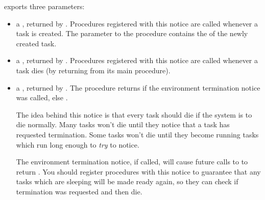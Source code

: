  exports three parameters:
\begin{itemize}
\item
 a , returned by .  Procedures
 registered with this notice are called whenever a task is created.
 The  parameter to the procedure contains the
  of the newly created task.
\item
 a , returned by .  Procedures
 registered with this notice are called whenever a task dies (by
 returning from its main procedure).
\item
 a , returned by
 .  The procedure  returns
  if the environment termination notice was called, else
 .
 
 The idea behind this notice is that every task should die if the system is 
 to die
 normally.  Many tasks won't die until they notice that a task has requested
 termination.  Some tasks won't die until they become running tasks which run
 long enough to {\em try\/} to notice.
 
 The environment termination notice, if called, will cause future calls
 to  to return .  You should register
 procedures with this notice to guarantee that any tasks which are
 sleeping will be made ready again, so they can check if termination
 was requested and then die.
\end{itemize}

